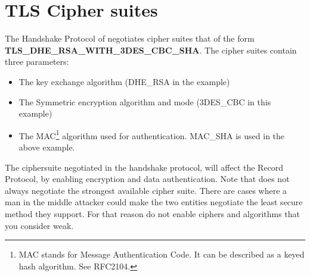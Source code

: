 \newpage
\section{TLS Cipher suites}
\par 
The Handshake Protocol of \tlsI{} negotiates cipher suites 
that of the form \\
{\bf TLS\_DHE\_RSA\_WITH\_3DES\_CBC\_SHA}.
The cipher suites contain three parameters:
\begin{itemize}
\item The key exchange algorithm (DHE\_RSA in the example)
\item The Symmetric encryption algorithm and mode (3DES\_CBC in this
example)
\item The MAC\footnote{MAC stands for Message Authentication Code. It can
be described as a keyed hash algorithm. See RFC2104.} algorithm used for authentication.
MAC\_SHA is used in the above example.
\end{itemize}

The ciphersuite negotiated in the handshake protocol, will affect 
the Record Protocol, by enabling encryption and data authentication.
Note that \tlsI does not always
negotiate the strongest available cipher suite. There are cases where
a man in the middle attacker could make the two entities negotiate
the least secure method they support. For that reason do not enable
ciphers and algorithms that you consider weak.

\addvspace{1.5cm}

